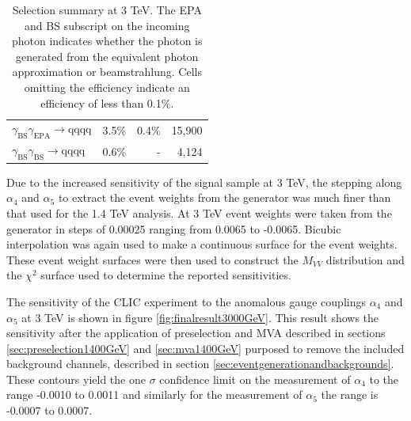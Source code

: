 \begin{table}[h!]
\begin{tabular}{ l r r r }
$\gamma_{\text{BS}}\gamma_{\text{EPA}} \rightarrow \text{qqqq}$ & 3.5\% & 0.4\% & 15,900 \\
$\gamma_{\text{BS}}\gamma_{\text{BS}} \rightarrow \text{qqqq}$ & 0.6\% & - & 4,124 \\
\hline
\end{tabular}
\caption[Selection summary at 3 TeV.  The EPA and BS subscript on the incoming photon indicates whether the photon is generated from the equivalent photon approximation or beamstrahlung.  Cells omitting the efficiency indicate an efficiency of less than 0.1\%.]{Selection summary at 3 TeV.  The EPA and BS subscript on the incoming photon indicates whether the photon is generated from the equivalent photon approximation or beamstrahlung.  Cells omitting the efficiency indicate an efficiency of less than 0.1\%.}
\label{table:selectionsummary3000GeV}
\end{table}

Due to the increased sensitivity of the signal sample at 3 TeV, the stepping along $\alpha_{4}$ and $\alpha_{5}$ to extract the event weights from the generator was much finer than that used for the 1.4 TeV analysis.  At 3 TeV event weights were taken from the generator in steps of 0.00025 ranging from 0.0065 to -0.0065.  Bicubic interpolation was again used to make a continuous surface for the event weights.  These event weight surfaces were then used to construct the $M_{VV}$ distribution and the $\chi^{2}$ surface used to determine the reported sensitivities.

The sensitivity of the CLIC experiment to the anomalous gauge couplings $\alpha_{4}$ and $\alpha_{5}$ at 3 TeV is shown in figure \ref{fig:finalresult3000GeV}.  This result shows the sensitivity after the application of preselection and MVA described in sections \ref{sec:preselection1400GeV} and \ref{sec:mva1400GeV} purposed to remove the included background channels, described in section \ref{sec:eventgenerationandbackgrounds}.  These contours yield the one $\sigma$ confidence limit on the measurement of $\alpha_{4}$ to the range -0.0010 to 0.0011 and similarly for the measurement of $\alpha_{5}$ the range is -0.0007 to 0.0007.

